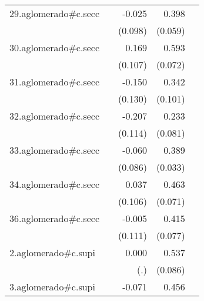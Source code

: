 {\begin{longtable}{l*{4}{D{.}{.}{-1}}}
\addlinespace
29.aglomerado#c.secc&                     &      -0.025         &       0.398\sym{***}&                     \\
            &                     &     (0.098)         &     (0.059)         &                     \\
\addlinespace
30.aglomerado#c.secc&                     &       0.169         &       0.593\sym{***}&                     \\
            &                     &     (0.107)         &     (0.072)         &                     \\
\addlinespace
31.aglomerado#c.secc&                     &      -0.150         &       0.342\sym{***}&                     \\
            &                     &     (0.130)         &     (0.101)         &                     \\
\addlinespace
32.aglomerado#c.secc&                     &      -0.207         &       0.233\sym{**} &                     \\
            &                     &     (0.114)         &     (0.081)         &                     \\
\addlinespace
33.aglomerado#c.secc&                     &      -0.060         &       0.389\sym{***}&                     \\
            &                     &     (0.086)         &     (0.033)         &                     \\
\addlinespace
34.aglomerado#c.secc&                     &       0.037         &       0.463\sym{***}&                     \\
            &                     &     (0.106)         &     (0.071)         &                     \\
\addlinespace
36.aglomerado#c.secc&                     &      -0.005         &       0.415\sym{***}&                     \\
            &                     &     (0.111)         &     (0.077)         &                     \\
\addlinespace
2.aglomerado#c.supi&                     &       0.000         &       0.537\sym{***}&                     \\
            &                     &         (.)         &     (0.086)         &                     \\
\addlinespace
3.aglomerado#c.supi&                     &      -0.071         &       0.456\sym{***}&                     \\

\end{longtable}}
